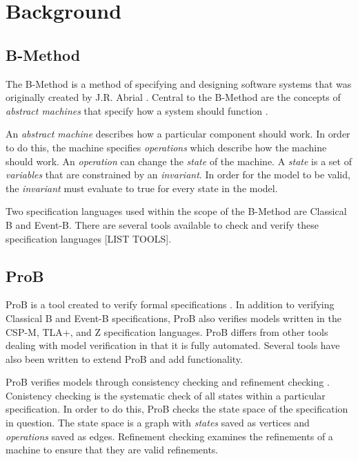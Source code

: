 \section{Background}

\subsection{B-Method}

The B-Method is a method of specifying and designing software systems that was originally created by J.R. Abrial \cite{abrial2005b}. Central to the B-Method are the concepts of \emph{abstract machines} that specify how a system should function \cite{schneider2001b}.

An \emph{abstract machine} describes how a particular component should work. In order to do this, the machine specifies \emph{operations} which describe how the machine should work. An \emph{operation} can change the \emph{state} of the machine. A \emph{state} is a set of \emph{variables} that are constrained by an \emph{invariant}. In order for the model to be valid, the \emph{invariant} must evaluate to true for every state in the model.

Two specification languages used within the scope of the B-Method are Classical B and Event-B. There are several tools available to check and verify these specification languages [LIST TOOLS].

\subsection{ProB}

ProB is a tool created to verify formal specifications \cite{LeBu08_225}. In addition to verifying Classical B and Event-B specifications, ProB also verifies models written in the CSP-M, TLA+, and Z specification languages. ProB differs from other tools dealing with model verification in that it is fully automated. Several tools have also been written to extend ProB and add functionality.

ProB verifies models through consistency checking \cite{LeBu03_32} and refinement checking \cite{LeBu05_5}. Conistency checking is the systematic check of all states within a particular specification. In order to do this, ProB checks the state space of the specification in question. The state space is a graph with \emph{states} saved as vertices and \emph{operations} saved as edges. Refinement checking examines the refinements of a machine to ensure that they are valid refinements.

